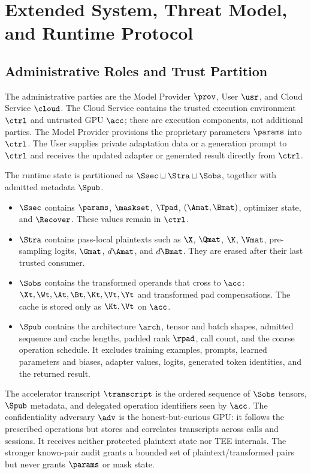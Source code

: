 \section{Extended System, Threat Model, and Runtime Protocol}
\label{app:protocol}
\label{app:impl}

\subsection{Administrative Roles and Trust Partition}

The administrative parties are the Model Provider $\prov$, User $\usr$, and
Cloud Service $\cloud$. The Cloud Service contains the trusted execution
environment $\ctrl$ and untrusted GPU $\acc$; these are execution components,
not additional parties. The Model Provider provisions the proprietary
parameters $\params$ into $\ctrl$. The User supplies private adaptation data or
a generation prompt to $\ctrl$ and receives the updated adapter or generated
result directly from $\ctrl$.

The runtime state is partitioned as $\Ssec\sqcup\Stra\sqcup\Sobs$, together
with admitted metadata $\Spub$.
\begin{itemize}
\item $\Ssec$ contains $\params$, $\maskset$, $\Tpad$, $(\Amat,\Bmat)$,
optimizer state, and $\Recover$. These values remain in $\ctrl$.
\item $\Stra$ contains pass-local plaintexts such as $\X$, $\Qmat$, $\K$,
$\Vmat$, pre-sampling logits, $\Gmat$, $d\Amat$, and $d\Bmat$. They are erased
after their last trusted consumer.
\item $\Sobs$ contains the transformed operands that cross to $\acc$:
$\Xt,\Wt,\At,\Bt,\Kt,\Vt,\Yt$ and transformed pad compensations. The cache is
stored only as $\Kt,\Vt$ on $\acc$.
\item $\Spub$ contains the architecture $\arch$, tensor and batch shapes,
admitted sequence and cache lengths, padded rank $\rpad$, call count, and the
coarse operation schedule. It excludes training examples, prompts, learned
parameters and biases, adapter values, logits, generated token identities, and
the returned result.
\end{itemize}

The accelerator transcript $\transcript$ is the ordered sequence of $\Sobs$
tensors, $\Spub$ metadata, and delegated operation identifiers seen by $\acc$.
The confidentiality adversary $\adv$ is the honest-but-curious GPU: it follows
the prescribed operations but stores and correlates transcripts across calls
and sessions. It receives neither protected plaintext state nor TEE internals.
The stronger known-pair audit grants a bounded set of plaintext/transformed
pairs but never grants $\params$ or mask state.

